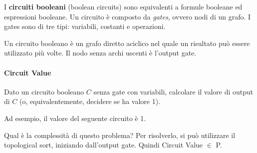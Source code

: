 I \textbf{circuiti booleani} (boolean circuits) sono equivalenti a formule booleane ed espressioni booleane. Un circuito è composto da \emph{gates}, ovvero nodi di un grafo. I gates sono di tre tipi: variabili, costanti e operazioni.

\begin{center}
\end{center}
Un circuito booleano è un grafo diretto aciclico nel quale un risultato può essere utilizzato più volte. Il nodo senza archi uscenti è l'output gate.

\paragraph{Circuit Value} Dato un circuito booleano $C$ senza gate con variabili, calcolare il valore di output di $C$ (o, equivalentemente, decidere se ha valore 1).\medskip

Ad esempio, il valore del seguente circuito è 1.
\begin{center}
\end{center}
Qual è la complessità di questo problema? Per risolverlo, si può utilizzare il topological sort, iniziando dall'output gate. Quindi Circuit Value $\in$ P.

